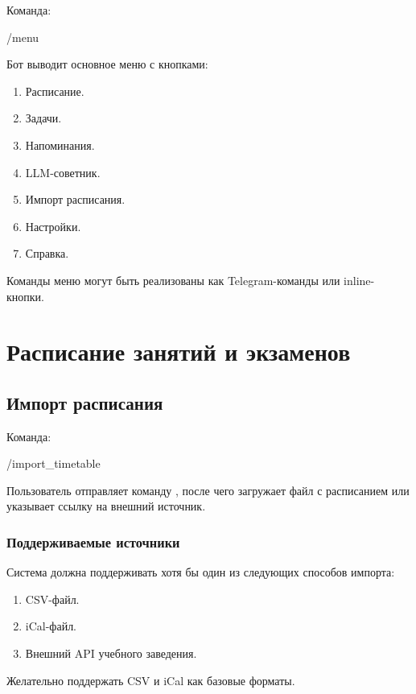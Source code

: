 \documentclass[10pt,a4paper,final]{article} %
\begin{document}
Команда:

\begin{Code}
/menu
\end{Code}

Бот выводит основное меню с кнопками:

\begin{enumerate}
    \item Расписание.
    \item Задачи.
    \item Напоминания.
    \item LLM-советник.
    \item Импорт расписания.
    \item Настройки.
    \item Справка.
\end{enumerate}

Команды меню могут быть реализованы как Telegram-команды или inline-кнопки.

\section{Расписание занятий и экзаменов}

\subsection{Импорт расписания}

Команда:

\begin{Code}
/import\_timetable
\end{Code}

Пользователь отправляет команду , после чего загружает файл с расписанием или указывает ссылку на внешний источник.

\subsubsection{Поддерживаемые источники}

Система должна поддерживать хотя бы один из следующих способов импорта:

\begin{enumerate}
    \item CSV-файл.
    \item iCal-файл.
    \item Внешний API учебного заведения.
\end{enumerate}

Желательно поддержать CSV и iCal как базовые форматы.
\end{document}
